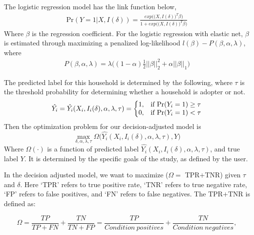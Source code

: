 The logistic regression model has the link function below,
\begin{align*}
\text{Pr}(Y=1|X, I(\delta))=\frac{exp\Big(\big(X, I(\delta)\big)^T\beta\Big)}{1+exp\Big(\big(X, I(\delta)\big)^T\beta\Big)}
\end{align*}
Where $\beta$ is the regression coefficient. For the logistic regression with elastic net, $\beta$ is estimated through maximizing a penalized log-likelihood $l(\beta)-P(\beta,\alpha,\lambda)$, where 
\begin{align*}
P(\beta,\alpha,\lambda)=\lambda\big((1-\alpha)\frac{1}{2}||\beta||_2^2+\alpha||\beta||_1\big)
\end{align*}


The predicted label for this household is determined by the following, where $\tau$ is the threshold probability for determining whether a household is adopter or not. 
\begin{equation*}
\hat{Y_i}=\hat{Y_i}(X_i,I_i(\delta),\alpha,\lambda,\tau)=\left\{
\begin{array}{@{}ll@{}}
1, & \text{if Pr}(Y_i=1)\ge \tau \\
0, & \text{if Pr}(Y_i=1)< \tau
\end{array}\right.
\end{equation*}
Then the optimization problem for our decision-adjusted model is
\begin{equation*}
\max_{\delta,\alpha,\lambda,\tau} \Omega\Big(\hat{Y_i}(X_i,I_i(\delta),\alpha,\lambda,\tau),Y\Big)
\end{equation*}
Where $\Omega(\cdot)$ is a function of predicted label
$\hat{Y_i}(X_i,I_i(\delta),\alpha,\lambda,\tau)$, and true label
$Y$. It is determined by the specific goals of the study, as defined
by the user. 

In the decision adjusted model, we want to maximize ($\Omega=$
TPR$+$TNR) given $\tau$ and $\delta$. Here `TPR' refers to true
positive rate, `TNR' refers to true negative rate, `FP' refers to false positives, and `FN' refers to false negatives. The TPR$+$TNR is defined as:


\begin{equation*}
            \Omega=\frac{TP}{TP+FN}+\frac{TN}{TN+FP}=\frac{TP}{Condition\ positives}+\frac{TN}{Condition\ negatives},
        \end{equation*}

